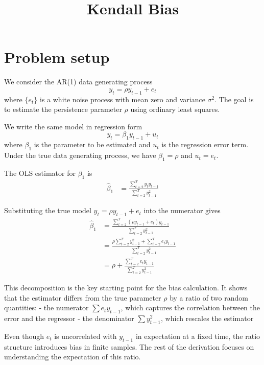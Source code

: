 \documentclass[11pt]{article}
\title{Kendall Bias}
\begin{document}
    
    \maketitle
    
    

    
    \section{Problem setup}\label{problem-setup}

We consider the AR(1) data generating process \[
y_t = \rho y_{t-1}+e_t
\] where \(\{e_t\}\) is a white noise process with mean zero and
variance \(\sigma^2\). The goal is to estimate the persistence parameter
\(\rho\) using ordinary least squares.

We write the same model in regression form \[
y_t = \beta_1 y_{t-1}+u_t
\] where \(\beta_1\) is the parameter to be estimated and \(u_t\) is the
regression error term. Under the true data generating process, we have
\(\beta_1 = \rho\) and \(u_t = e_t\).

The OLS estimator for \(\beta_1\) is \[
\begin{aligned}
\hat\beta_{1} &= \frac{\sum_{t=2}^{T} y_t y_{t-1}}{\sum_{t=2}^{T} y_{t-1}^2}
\end{aligned}
\]

Substituting the true model \(y_t = \rho y_{t-1} + e_t\) into the
numerator gives \[
\begin{aligned}
\hat\beta_{1}
&= \frac{\sum_{t=2}^{T} (\rho y_{t-1}+e_t) y_{t-1}}{\sum_{t=2}^{T} y_{t-1}^2} \\
&= \frac{\rho \sum_{t=2}^{T} y_{t-1}^2 + \sum_{t=2}^{T} e_t y_{t-1}}{\sum_{t=2}^{T} y_{t-1}^2} \\
&= \rho+\frac{\sum_{t=2}^{T} e_t y_{t-1}}{\sum_{t=2}^{T} y_{t-1}^2}
\end{aligned}
\]

This decomposition is the key starting point for the bias calculation.
It shows that the estimator differs from the true parameter \(\rho\) by
a ratio of two random quantities: - the numerator \(\sum e_t y_{t-1}\),
which captures the correlation between the error and the regressor - the
denominator \(\sum y_{t-1}^2\), which rescales the estimator

Even though \(e_t\) is uncorrelated with \(y_{t-1}\) in expectation at a
fixed time, the ratio structure introduces bias in finite samples. The
rest of the derivation focuses on understanding the expectation of this
ratio.
\end{document}
